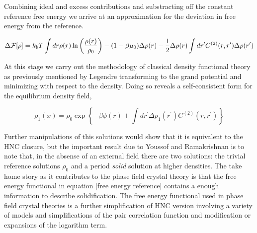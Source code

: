 Combining ideal and excess contributions and substracting off the constant reference free energy we arrive at an approximation for the deviation in free energy from the reference. 

\begin{equation}
    \Delta \mathcal{F} [\rho] = k_b T \int dr \rho(r) \ln\left(\frac{\rho(r)}{\rho_0}\right) -(1-\beta\mu_0) \Delta \rho(r) - \frac{1}{2}\Delta \rho(r) \int dr^\prime C^{(2)}(r, r^\prime) \Delta \rho(r^\prime)
\end{equation}

At this stage we carry out the methodology of classical density functional theory as previously mentioned by Legendre transforming to the grand potential and minimizing with respect to the density. Doing so reveals a self-consistent form for the equilibrium density field, 

\begin{equation}
    \rho_1(x) = \rho_0 \exp\left\lbrace-\beta\phi(r) + \int dr^\prime \Delta\rho_1(r^\prime) C^{(2)}(r, r^\prime)\right\rbrace
\end{equation}

Further manipulations of this solutions would show that it is equivalent to the HNC closure, but the important result due to Youssof and Ramakrishnan is to note that, in the absense of an external field there are two solutions: the trivial reference solutions $\rho_0$ and a period \textit{solid} solution at higher densities. The take home story as it contributes to the phase field crystal theory is that the free energy functional in equation [free energy reference] contains a enough information to describe solidification. The free energy functional used in phase field crystal theories is a further simplification of HNC version involving a variety of models and simplifications of the pair correlation function and modification or expansions of the logarithm term.
